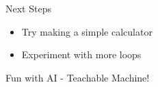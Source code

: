 \begin{frame}{Next Steps}
    \begin{itemize}
      \item Try making a simple calculator
      \item Experiment with more loops
    \end{itemize}
    
    \vspace{0.5cm}
     Fun with AI - Teachable Machine!
  \end{frame}